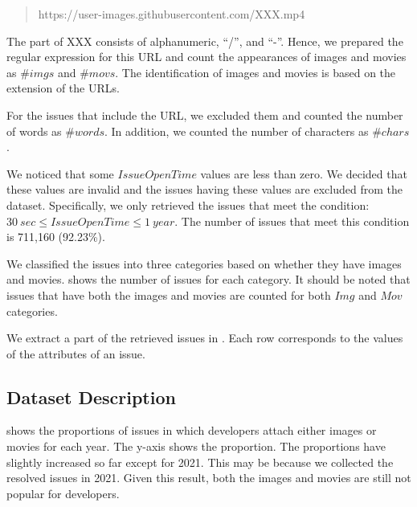 \begin{quote}
	https://user-images.githubusercontent.com/XXX.mp4
\end{quote}

\noindent{}
The part of XXX consists of alphanumeric, ``/'', and ``-''.
Hence, we prepared the regular expression for this URL and 
count the appearances of images and movies as $\#imgs$ and $\#movs$. 
The identification of images and movies is based on the extension of 
the URLs. 

For the issues that include the URL, we excluded them and 
counted the number of words as $\#words$. 
In addition, we counted the number of characters as $\#chars$. 

We noticed that some $IssueOpenTime$ values are less than zero. 
We decided that these values are invalid and the issues having 
these values are excluded from the dataset. 
Specifically, we only retrieved the issues that meet 
the condition: $30\ sec \leq IssueOpenTime \leq 1\ year$.
The number of issues that meet this condition is 711,160 (92.23\%).



We classified the issues into three categories based on 
whether they have images and movies. 
 shows the number of issues for each category. 
It should be noted that issues that have both 
the images and movies are counted for both 
$Img$ and $Mov$ categories. 



We extract a part of the retrieved issues in . 
Each row corresponds to the values of the attributes of an issue. 

\subsection{Dataset Description}



 shows the proportions of 
issues in which developers attach either 
images or movies for each year. 
The y-axis shows the proportion. 
The proportions have slightly increased so far 
except for 2021. 
This may be because we collected the resolved issues 
in 2021. 
Given this result, both the images and movies are still 
not popular for developers. 
